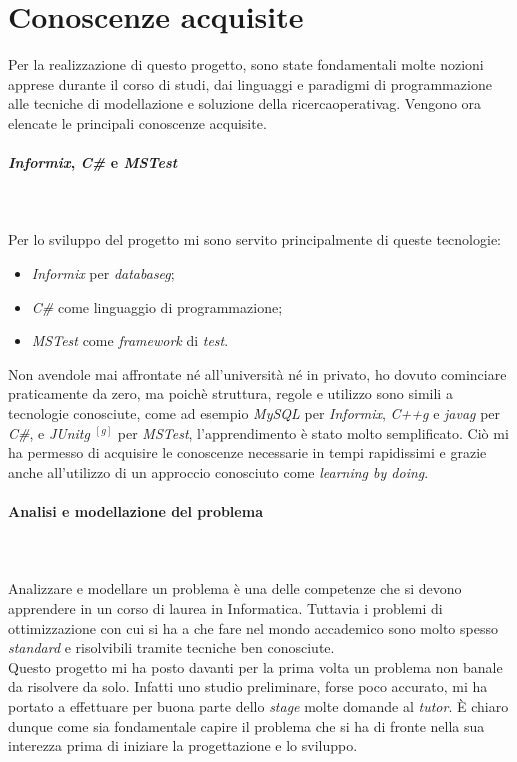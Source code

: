 \section{Conoscenze acquisite}
\label{sec:conoscenze-acquisite}
\noindent Per la realizzazione di questo progetto, sono state fondamentali
molte nozioni apprese durante il corso di studi,
dai linguaggi e paradigmi di programmazione
alle tecniche di modellazione e soluzione della \gls{ricercaoperativag}.
Vengono ora elencate le principali conoscenze acquisite.
\paragraph{\textit{Informix}, \textit{C\#} e \textit{MSTest}}\hfill\\\\
\noindent Per lo sviluppo del progetto mi sono servito principalmente di queste tecnologie:
\begin{itemize}
    \item \textit{Informix} per \textit{\gls{databaseg}};
    \item \textit{C\#} come linguaggio di programmazione;
    \item \textit{MSTest} come \textit{framework} di \textit{test}.
\end{itemize}
\noindent Non avendole mai affrontate né all’università né in privato, ho dovuto
cominciare praticamente da zero, ma poichè struttura, regole e utilizzo sono simili
a tecnologie conosciute, come ad esempio \textit{MySQL} per \textit{Informix}, \textit{\gls{C++g}} e \textit{\gls{javag}} per \textit{C\#},
e \textit{\gls{JUnitg}} $^{[g]}$ per \textit{MSTest}, l’apprendimento è stato molto semplificato.
Ciò mi ha permesso di acquisire le conoscenze necessarie in tempi rapidissimi
e grazie anche all'utilizzo di un approccio conosciuto come \textit{learning
by doing}.
\paragraph{Analisi e modellazione del problema}\hfill\\\\
Analizzare e modellare un problema è una delle competenze che si devono apprendere
in un corso di laurea in Informatica.
Tuttavia i problemi di ottimizzazione con cui si ha a che fare
nel mondo accademico sono molto spesso \textit{standard} e risolvibili tramite tecniche ben conosciute.\\
Questo progetto mi ha posto davanti per la prima volta un problema
non banale da risolvere da solo. Infatti uno studio preliminare, forse poco accurato,
mi ha portato a effettuare per buona parte dello \textit{stage} molte domande al \textit{tutor}.
È chiaro dunque come sia fondamentale capire il problema che si ha di fronte nella
sua interezza prima di iniziare la progettazione e lo sviluppo.

